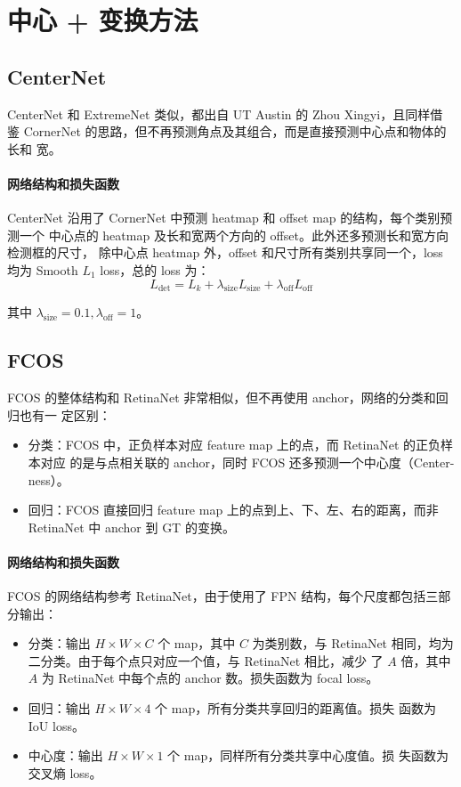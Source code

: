 \section{中心 + 变换方法}
\subsection{CenterNet}
\label{sec:CenterNet}
CenterNet 和 ExtremeNet 类似，都出自 UT Austin 的 Zhou Xingyi，且同样借
鉴 CornerNet 的思路，但不再预测角点及其组合，而是直接预测中心点和物体的长和
宽。

\paragraph{网络结构和损失函数}
CenterNet 沿用了 CornerNet 中预测 heatmap 和 offset map 的结构，每个类别预测一个
中心点的 heatmap 及长和宽两个方向的 offset。此外还多预测长和宽方向检测框的尺寸，
除中心点 heatmap 外，offset 和尺寸所有类别共享同一个，loss 均为 Smooth $L_1$
loss，总的 loss 为：
\begin{equation}
  \label{equ:extreme-net-loss}
  L_{\mathrm{det}} = L_k + \lambda_{\mathrm{size}}L_{\mathrm{size}} + \lambda_{\mathrm{off}}L_{\mathrm{off}}
\end{equation}

其中 $\lambda_{\mathrm{size}}=0.1, \lambda_{\mathrm{off}}=1$。

\subsection{FCOS}
\label{sec:FCOS}
FCOS 的整体结构和 RetinaNet 非常相似，但不再使用 anchor，网络的分类和回归也有一
定区别：

\begin{itemize}
  \item 分类：FCOS 中，正负样本对应 feature map 上的点，而 RetinaNet 的正负样本对应
    的是与点相关联的 anchor，同时 FCOS 还多预测一个中心度（Center-ness）。
  \item 回归：FCOS 直接回归 feature map 上的点到上、下、左、右的距离，而非 RetinaNet
    中 anchor 到 GT 的变换。
\end{itemize}

\paragraph{网络结构和损失函数}
FCOS 的网络结构参考 RetinaNet，由于使用了 FPN 结构，每个尺度都包括三部分输出：
\begin{itemize}
  \item 分类：输出 $H \times W \times C$ 个 map，其中 $C$ 为类别数，与
    RetinaNet 相同，均为二分类。由于每个点只对应一个值，与 RetinaNet 相比，减少
    了 $A$ 倍，其中 $A$ 为 RetinaNet 中每个点的 anchor 数。损失函数为 focal loss。
  \item 回归：输出 $H \times W \times 4$ 个 map，所有分类共享回归的距离值。损失
    函数为 IoU loss。
  \item 中心度：输出 $H \times W \times 1$ 个 map，同样所有分类共享中心度值。损
    失函数为交叉熵 loss。
\end{itemize}

